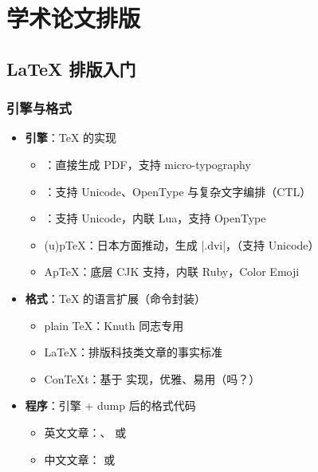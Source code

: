 
\section{学术论文排版}
\subsection{\LaTeX{} 排版入门}

\begin{frame}[fragile]
  \frametitle{引擎与格式}
  \begin{itemize}
    \item \textbf{引擎}：\TeX{} 的实现
  
      \begin{itemize}
        \item \pdfTeX{}：直接生成 PDF，支持 micro-typography
        \item \XeTeX{}：支持 Unicode、OpenType 与复杂文字编排（CTL）
        \item \LuaTeX{}：支持 Unicode，内联 Lua，支持 OpenType
        \item (u)p\TeX{}：日本方面推动，生成 |.dvi|，（支持 Unicode）
        \item Ap\TeX{}：底层 CJK 支持，内联 Ruby，Color Emoji
      \end{itemize}
  
    \item \textbf{格式}：\TeX{} 的语言扩展（命令封装）
  
      \begin{itemize}
        \item plain \TeX{}：Knuth 同志专用
        \item \LaTeX{}：排版科技类文章的事实标准
        \item Con\TeX t：基于 \LuaTeX{} 实现，优雅、易用（吗？）
      \end{itemize}
  
    \item \textbf{程序}：引擎 + dump 后的格式代码
  
      \begin{itemize}
        \item \alert{英文文章：\pdfLaTeX{}、\XeLaTeX{} 或 \LuaLaTeX{}}
        \item \alert{中文文章：\XeLaTeX{} 或 \LuaLaTeX{}}
      \end{itemize}
  \end{itemize}
\end{frame}

